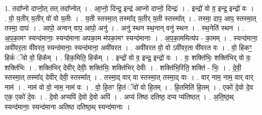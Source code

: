 \documentclass[17pt]{extarticle}
\begin{document}
1. तदा᳚प्नो दाप्नो॒त् तत् तदा᳚प्नोत् । . आ॒प्नो॒ दिन्द्र॒ इन्द्र॑ आप्नो दाप्नो॒ दिन्द्रः॑ । . इन्द्रो॑ वो व॒ इन्द्र॒ इन्द्रो॑ वः । . वो॒ य॒तीर् य॒तीर् वो॑ वो य॒तीः । . य॒ती स्तस्मा॒त् तस्मा᳚द् य॒तीर् य॒ती स्तस्मा᳚त् । . तस्मा॒ दाप॒ आप॒ स्तस्मा॒त् तस्मा॒ दापः॑ । . आपो॒ अन्वन् वाप॒ आपो॒ अनु॑ । . अनु॑ स्थन स्थ॒नान् वनु॑ स्थन । . स्थ॒नेति॑ स्थन । . अ॒प॒का॒मꣳ स्यन्द॑मानाः॒ स्यन्द॑माना अपका॒म म॑पका॒मꣳ स्यन्द॑मानाः । . अ॒प॒का॒ममित्य॑प - का॒मम् । . स्यन्द॑माना॒ अवी॑वर॒ता वी॑वरत॒ स्यन्द॑मानाः॒ स्यन्द॑माना॒ अवी॑वरत । . अवी॑वरत वो॒ वो ऽवी॑वर॒ता वी॑वरत वः । . वो॒ हिकꣳ॒॒ हिकं॑ ॅवो वो॒ हिक᳚म् । . हिक॒मिति॒ हिक᳚म् । . इन्द्रो॑ वो व॒ इन्द्र॒ इन्द्रो॑ वः । . वः॒ शक्ति॑भिः॒ शक्ति॑भिर् वो वः॒ शक्ति॑भिः । . शक्ति॑भिर् देवीर् देवीः॒ शक्ति॑भिः॒ शक्ति॑भिर् देवीः । . शक्ति॑भि॒रिति॒ शक्ति॑ - भिः॒ । . दे॒वी॒ स्तस्मा॒त् तस्मा᳚द् देवीर् देवी॒ स्तस्मा᳚त् । . तस्मा॒द् वार् वा स्तस्मा॒त् तस्मा॒द् वाः । . वार् नाम॒ नाम॒ वार् वार् नाम॑ । . नाम॑ वो वो॒ नाम॒ नाम॑ वः । . वो॒ हि॒तꣳ हि॒तं ॅवो॑ वो हि॒तम् । . हि॒तमिति॑ हि॒तम् । . एको॑ दे॒वो दे॒व एक॒ एको॑ दे॒वः । . दे॒वो अप्यपि॑ दे॒वो दे॒वो अपि॑ । . अप्य॑ तिष्ठ दतिष्ठ॒ दप्य प्य॑तिष्ठत् । . अ॒ति॒ष्ठ॒थ् स्यन्द॑मानाः॒ स्यन्द॑माना अतिष्ठ दतिष्ठ॒थ् स्यन्द॑मानाः । \newline
\end{document}
